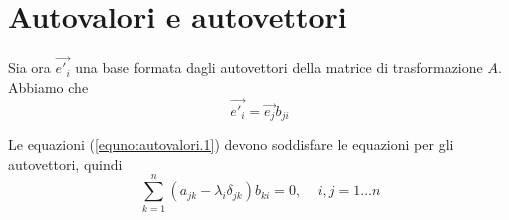 \section{Autovalori e autovettori}
Sia ora $\vec{e'_i}$ una base formata dagli autovettori della matrice di
trasformazione $A$.
Abbiamo che
\begin{equation}
  \vec{e'_i}=\vec{e_j}b_{ji}
  \label{equno:autovalori.1}
\end{equation}

Le equazioni (\ref{equno:autovalori.1}) devono soddisfare le equazioni per
gli autovettori, quindi
\begin{equation}
  \sum_{k=1}^n\left( a_{jk} - \lambda_i \delta_{jk}\right)b_{ki}=0
  ,\;\;\;\;i,j=1\dots n
  \label{equno:autovalori.2}
\end{equation}

